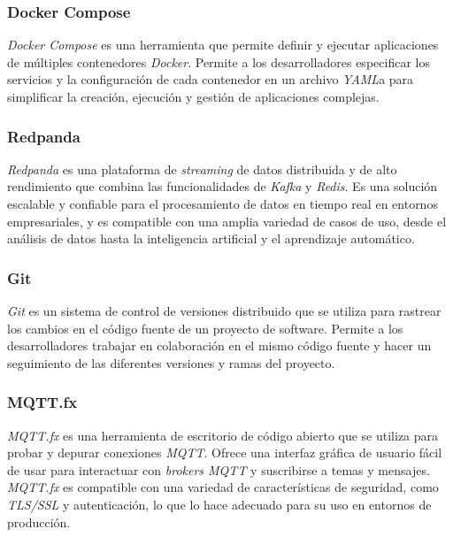 \subsubsection{Docker Compose}

\textit{Docker Compose} \citep{docker-compose} es una herramienta que permite definir y ejecutar aplicaciones de múltiples contenedores \textit{Docker}. Permite a los desarrolladores especificar los servicios y la configuración de cada contenedor en un archivo \textit{YAML}a \citep{yaml} para simplificar la creación, ejecución y gestión de aplicaciones complejas. 


\subsubsection{Redpanda}

\textit{Redpanda} \citep{redpanda} es una plataforma de \textit{streaming} de datos distribuida y de alto rendimiento que combina las funcionalidades de \textit{Kafka} y \textit{Redis}. Es una solución escalable y confiable para el procesamiento de datos en tiempo real en entornos empresariales, y es compatible con una amplia variedad de casos de uso, desde el análisis de datos hasta la inteligencia artificial y el aprendizaje automático.


\subsubsection{Git}

\textit{Git} \citep{git} es un sistema de control de versiones distribuido que se utiliza para rastrear los cambios en el código fuente de un proyecto de software. Permite a los desarrolladores trabajar en colaboración en el mismo código fuente y hacer un seguimiento de las diferentes versiones y ramas del proyecto. 


\subsubsection{MQTT.fx}

\textit{MQTT.fx} \citep{mqtt-fx} es una herramienta de escritorio de código abierto que se utiliza para probar y depurar conexiones \textit{MQTT}. Ofrece una interfaz gráfica de usuario fácil de usar para interactuar con \textit{brokers MQTT} y suscribirse a temas y mensajes. \textit{MQTT.fx} es compatible con una variedad de características de seguridad, como \textit{TLS/SSL} y autenticación, lo que lo hace adecuado para su uso en entornos de producción.


